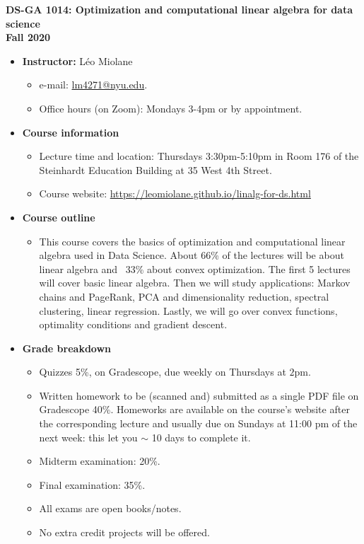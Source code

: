 \documentclass[11pt]{article}
\begin{document}
\begin{center}
	\textbf{\Large DS-GA 1014: Optimization and computational linear algebra for data science\\ \medskip Fall 2020}
\end{center}

\begin{itemize}
	\item \textbf{Instructor:} Léo Miolane
	\begin{itemize}
		\item e-mail: \url{lm4271@nyu.edu}. 
		\item Office hours (on Zoom): Mondays 3-4pm or by appointment.
	\end{itemize}
	
	\item \textbf{Course information}
	\begin{itemize}
		\item Lecture time and location: Thursdays 3:30pm-5:10pm in Room 176 of the Steinhardt Education Building at 35 West 4th Street.
	\item Course website: \url{https://leomiolane.github.io/linalg-for-ds.html}
	\end{itemize}
	
	\item \textbf{Course outline}
	\begin{itemize}
		\item This course covers the basics of optimization and computational linear algebra used in Data Science. About 66\% of the lectures will be about linear algebra and ~33\% about convex optimization. The first 5 lectures will cover basic linear algebra. Then we will study applications: Markov chains and PageRank, PCA and dimensionality reduction, spectral clustering, linear regression. Lastly, we will go over convex functions, optimality conditions and gradient descent.
	\end{itemize}
	
	\item \textbf{Grade breakdown}
	\begin{itemize}
		\item Quizzes 5\%, on Gradescope, due weekly on Thursdays at $2$pm.
		\item Written homework to be (scanned and) submitted as a single PDF file on Gradescope 40\%. Homeworks are available on the course's website after the corresponding lecture and usually due on Sundays at 11:00 pm of the next week: this let you $\sim$ 10 days to complete it.
		\item Midterm examination: 20\%. 
		\item Final examination: 35\%. 
		\item All exams are open books/notes.
		\item No extra credit projects will be offered.
	\end{itemize}
	

\end{itemize}
\end{document}
